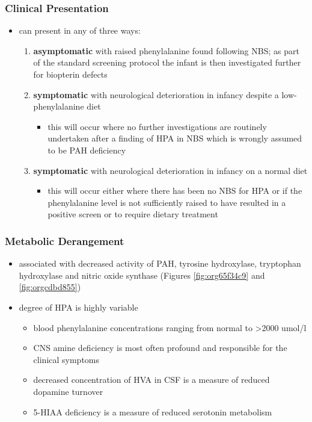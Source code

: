 \documentclass[12pt]{scrartcl}
\begin{document}
\subsubsection{Clinical Presentation}
\label{sec:orgfbb7ddd}
\begin{itemize}
\item can present in any of three ways:
\begin{enumerate}
\item \textbf{asymptomatic} with raised phenylalanine found following NBS; as part of
the standard screening protocol the infant is then investigated
further for biopterin defects
\item \textbf{symptomatic} with neurological deterioration in infancy despite a
low-phenylalanine diet
\begin{itemize}
\item this will occur where no further investigations are routinely
undertaken after a finding of HPA in NBS which is wrongly
assumed to be PAH deficiency
\end{itemize}
\item \textbf{symptomatic} with neurological deterioration in infancy on a
normal diet
\begin{itemize}
\item this will occur either where there has been no NBS for HPA or
if the phenylalanine level is not sufficiently raised to have
resulted in a positive screen or to require dietary treatment
\end{itemize}
\end{enumerate}
\end{itemize}
\subsubsection{Metabolic Derangement}
\label{sec:org08e0e94}
\begin{itemize}
\item associated with decreased activity of PAH, tyrosine hydroxylase,
tryptophan hydroxylase and nitric oxide synthase (Figures \ref{fig:org65f34c9}
and \ref{fig:orgcdbd855})
\item degree of HPA is highly variable
\begin{itemize}
\item blood phenylalanine concentrations ranging from normal to \textgreater{}2000
umol/l
\item CNS amine deficiency is most often profound and responsible for
the clinical symptoms
\item decreased concentration of HVA in CSF is a measure of reduced
dopamine turnover
\item 5-HIAA deficiency is a measure of reduced serotonin metabolism
\end{itemize}
\end{itemize}
\end{document}
